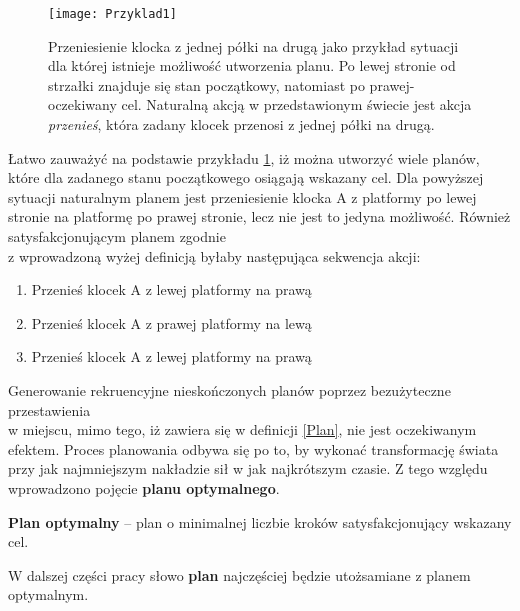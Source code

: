     \begin{figure}[H]
        \texttt{[image: Przyklad1]}
        \centering
        \caption{Przeniesienie klocka z jednej półki na drugą jako przykład sytuacji
        dla której istnieje możliwość utworzenia planu. Po lewej stronie od strzałki znajduje się stan
        początkowy, natomiast po prawej- oczekiwany cel. Naturalną akcją w przedstawionym świecie jest akcja \textit{przenieś}, która
        zadany klocek przenosi z jednej półki na drugą.}
        \label{Przyklad1}
    \end{figure}
    Łatwo zauważyć na podstawie przykładu \ref{Przyklad1}, iż można utworzyć wiele planów, które dla zadanego stanu początkowego 
    osiągają wskazany cel. Dla powyższej sytuacji naturalnym planem jest przeniesienie klocka A z platformy po lewej stronie na platformę po prawej stronie, 
    lecz nie jest to jedyna możliwość. Również satysfakcjonującym planem zgodnie\\
    z wprowadzoną wyżej definicją byłaby następująca sekwencja
    akcji:
    \begin{enumerate}
        \item Przenieś klocek A z lewej platformy na prawą
        \item Przenieś klocek A z prawej platformy na lewą
        \item Przenieś klocek A z lewej platformy na prawą
    \end{enumerate}
    Generowanie rekruencyjne nieskończonych planów poprzez bezużyteczne przestawienia \\
    w miejscu, mimo tego, iż zawiera się w definicji \ref{Plan},
    nie jest oczekiwanym efektem. Proces planowania odbywa się po to, by wykonać transformację świata przy jak najmniejszym
    nakładzie sił w jak najkrótszym czasie. Z tego względu wprowadzono pojęcie \textbf{planu optymalnego}.
    \begin{definition}
        \label{PlanOptymalny}
        \textbf{Plan optymalny} -- plan o minimalnej liczbie kroków satysfakcjonujący wskazany cel. 
    \end{definition}
     
    W dalszej części pracy słowo \textbf{plan} najczęściej będzie utożsamiane z planem optymalnym.
    
